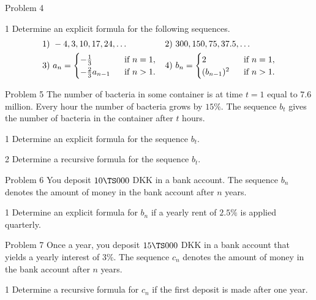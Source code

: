 \begin{opgavetekst}{Problem 4}
\end{opgavetekst}
\begin{delopgave}{1}
	Determine an explicit formula for the following sequences. 
	\begin{align*}
		&1) \ -4, 3, 10, 17, 24, \hdots  & &2) \ 300, 150, 75, 37.5, \hdots \\
		&3) \ 
		a_n = 
		\begin{cases}
			-\frac{1}{3} \ &\textnormal{ if } n = 1, \\
			-\frac{2}{3}a_{n-1} \ &\textnormal{ if } n>1.				
		\end{cases}
		& &4) \ 
		b_n = 
		\begin{cases}
			2 \ &\textnormal{ if } n = 1, \\
			(b_{n-1})^2 \ &\textnormal{ if } n > 1. \\
		\end{cases}
	\end{align*}
\end{delopgave}

\begin{opgavetekst}{Problem 5}
	The number of bacteria in some container is at time $t = 1$ equal to $7.6$ million. Every hour the number of 
	bacteria grows by $15\%$.
	The sequence $b_t$ gives the number of bacteria in the container after $t$ hours. 
\end{opgavetekst}
\begin{delopgave}{1}
	Determine an explicit formula for the sequence $b_t$.
\end{delopgave}
\begin{delopgave}{2}
	Determine a recursive formula for the sequence $b_t$.
\end{delopgave}

\begin{opgavetekst}{Problem 6}
	You deposit $10\TS 000$ DKK in a bank account. The sequence $b_n$ denotes the amount of money in the bank account after $n$ years.
\end{opgavetekst}
\begin{delopgave}{1}
	Determine an explicit formula for $b_n$ if a yearly rent of $2.5\%$ is applied quarterly.
\end{delopgave}

\begin{opgavetekst}{Problem 7}
	Once a year, you deposit $15\TS 000$ DKK in a bank account that yields a yearly interest of $3\%$.
	The sequence $c_n$ denotes the amount of money in the bank account after $n$ years. 
\end{opgavetekst}
\begin{delopgave}{1}
	Determine a recursive formula for $c_n$ if the first deposit is made after one year.
\end{delopgave}

